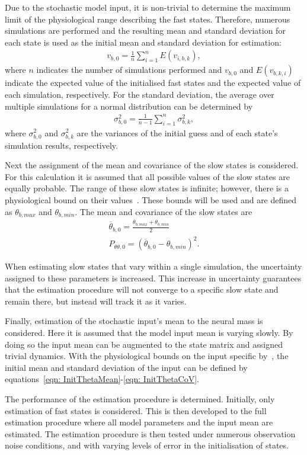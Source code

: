 Due to the stochastic model input, it is non-trivial to determine the maximum limit of the physiological range describing the fast states. Therefore, numerous simulations are performed and the resulting mean and standard deviation for each state is used as the initial mean and standard deviation for estimation: \begin{align}
v_{b,0} = \frac{1}{n}\sum\limits_{i=1}^n E(v_{i,b,k}), \end{align} where $n$ indicates the number of simulations performed and $v_{b,0}$ and $E(v_{b,k,i})$ indicate the expected value of the initialised fast states and the expected value of each simulation, respectively. For the standard deviation, the average over multiple simulations for a normal distribution can be determined by \begin{align}
\sigma^2_{b,0} = \frac{1}{n-1}\sum\limits_{i=1}^n \sigma^2_{b,k},\end{align} where $\sigma^2_{b,0}$ and $\sigma^2_{b,k}$ are the variances of the initial guess and of each state's simulation results, respectively.


Next the assignment of the mean and covariance of the slow states is considered. For this calculation it is assumed that all possible values of the slow states are equally probable. The range of these slow states is infinite; however, there is a physiological bound on their values~\citep{wendling2002epileptic}. These bounds will be used and are defined as $\theta_{b,max}$ and $\theta_{b,min}$. The mean and covariance of the slow states are\begin{align}
\label{eqn: InitThetaMean}
\overline{\theta}_{b,0} = \frac{\theta_{b,max}+\theta_{b,min}}{2}\\
\label{eqn: InitThetaCoV}
P_{\theta\theta,0} = (\overline{\theta}_{b,0}-\theta_{b,min})^2.
\end{align}

When estimating slow states that vary within a single simulation, the uncertainty assigned to these parameters is increased. This increase in uncertainty guarantees that the estimation procedure will not converge to a specific slow state and remain there, but instead will track it as it varies. 

Finally, estimation of the stochastic input's mean to the neural mass is considered. Here it is assumed that the model input mean is varying slowly. By doing so the input mean can be augmented to the state matrix and assigned trivial dynamics. With the physiological bounds on the input specific by~\cite{wendling2002epileptic}, the initial mean and standard deviation of the input can be defined by equations~\ref{eqn: InitThetaMean}-\ref{eqn: InitThetaCoV}.

The performance of the estimation procedure is determined. Initially, only estimation of fast states is considered. This is then developed to the full estimation procedure where all model parameters and the input mean are estimated. The estimation procedure is then tested under numerous observation noise conditions, and with varying levels of error in the initialisation of states.
